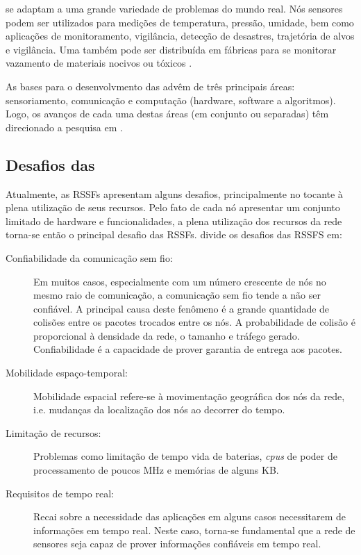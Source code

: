 \rssfs se adaptam a uma grande variedade de problemas do mundo real. Nós sensores podem ser utilizados para medições de temperatura, pressão, umidade, bem como aplicações de monitoramento, vigilância, detecção de desastres, trajetória de alvos e vigilância. Uma \rssf também pode ser distribuída em fábricas para se monitorar vazamento de materiais nocivos ou tóxicos \cite{Aboelaze2005}.


As bases para o desenvolvmento das \rssfs advêm de três principais áreas: sensoriamento, comunicação e computação (hardware, software a algoritmos). Logo, os avanços de cada uma destas áreas (em conjunto ou separadas) têm direcionado a pesquisa em \rssf\cite{Chong2003}. 

\subsection{Desafios das \rssfs}

Atualmente, as RSSFs apresentam alguns desafios, principalmente no tocante à plena utilização de seus recursos. Pelo fato de cada nó apresentar um conjunto limitado de hardware e funcionalidades, a plena utilização dos recursos da rede torna-se então o principal desafio das RSSFs.
\cite{Dressler2007} divide os desafios das RSSFS em:

\begin{description}
\item [Confiabilidade da comunicação sem fio:] Em muitos casos, especialmente com um número crescente de nós no mesmo raio de comunicação, a comunicação sem fio  tende a não ser confiável. A principal causa deste fenômeno é a grande quantidade de colisões entre os pacotes trocados entre os nós. A probabilidade de colisão é proporcional à densidade da rede, o tamanho e tráfego gerado. Confiabilidade é a capacidade de prover garantia de entrega aos pacotes.
			
\item [Mobilidade espaço-temporal:] Mobilidade espacial refere-se à movimentação geográfica dos nós da rede, i.e. mudanças da localização dos nós ao decorrer do tempo.
			
\item [Limitação de recursos:] Problemas como limitação de tempo vida de baterias, \emph{cpus} de poder de processamento de poucos MHz e memórias de alguns KB.
			
\item [Requisitos de tempo real:] Recai sobre a necessidade das aplicações em alguns casos necessitarem de informações em tempo real. Neste caso, torna-se fundamental que a rede de sensores seja capaz de prover informações confiáveis em tempo real.	
\end{description}

